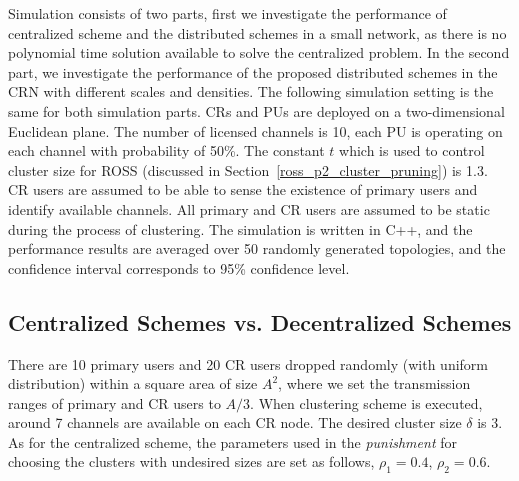 \documentclass[times]{ettauth}
\theoremstyle{mytheoremstyle}
\theoremstyle{mytheoremstyle}
\theoremstyle{mytheoremstyle}
\begin{document}
Simulation consists of two parts, first we investigate the performance of centralized scheme and the distributed schemes in a small network, as there is no polynomial time solution available to solve the centralized problem.
In the second part, we investigate the performance of the proposed distributed schemes in the CRN with different scales and densities.
The following simulation setting is the same for both simulation parts.
CRs and PUs are deployed on a two-dimensional Euclidean plane.
The number of licensed channels is 10, each PU is operating on each channel with probability of 50\%.
The constant $t$ which is used to control cluster size for ROSS (discussed in Section~\ref{ross_p2_cluster_pruning}) is 1.3.
CR users are assumed to be able to sense the existence of primary users and identify available channels.
All primary and CR users are assumed to be static during the process of clustering.
The simulation is written in C++, and the performance results are averaged over 50 randomly generated topologies, and the confidence interval corresponds to 95\% confidence level.


\subsection{Centralized Schemes vs. Decentralized Schemes}
There are 10 primary users and 20 CR users dropped randomly (with uniform distribution) within a square area of size $A^{2}$, where we set the transmission ranges of primary and CR users to $A/3$.
When clustering scheme is executed, around 7 channels are available on each CR node.
The desired cluster size $\delta$ is 3.
As for the centralized scheme, the parameters used in the \textit{punishment} for choosing the clusters with undesired sizes are set as follows, $\rho_1 =  0.4$, $\rho_2 =  0.6$.
\end{document}
